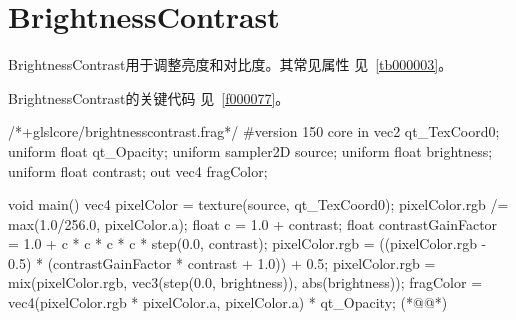﻿

\FloatBarrier
\section{
BrightnessContrast
}\label{c000015s000003}


BrightnessContrast用于调整亮度和对比度。其常见属性
见\tablename\ \ref{tb000003}。



BrightnessContrast的关键代码
见\filesourcenumbernameone\ \ref{f000077}。
\label{f000077}    %
\FloatBarrier                                  %
\begin{thebookfilesourceone}[escapeinside={(*@}{@*)},
caption=GoodLuck,
title=\filesourcenumbernameone \thefilesourcenumber
]
/*+glslcore/brightnesscontrast.frag*/
#version 150 core
in vec2 qt_TexCoord0;
uniform float qt_Opacity;
uniform sampler2D source;
uniform float brightness;
uniform float contrast;
out vec4 fragColor;

void main() {
    vec4 pixelColor = texture(source, qt_TexCoord0);
    pixelColor.rgb /= max(1.0/256.0, pixelColor.a);
    float c = 1.0 + contrast;
    float contrastGainFactor = 1.0 + c * c * c * c * step(0.0, contrast);
    pixelColor.rgb =
        ((pixelColor.rgb - 0.5) * (contrastGainFactor * contrast + 1.0)) + 0.5;
    pixelColor.rgb =
        mix(pixelColor.rgb, vec3(step(0.0, brightness)), abs(brightness));
    fragColor = vec4(pixelColor.rgb * pixelColor.a, pixelColor.a) * qt_Opacity;
}(*@\marginpar[\hfill\setlength\fboxsep{2pt}\fbox{\footnotesize{\kaishu\parbox{1em}{\setlength{\baselineskip}{2pt}\filesourcenumbernameone}}\footnotesize{\thefilesourcenumber}}]{\setlength\fboxsep{2pt}\fbox{\footnotesize{\kaishu\parbox{1em}{\setlength{\baselineskip}{2pt}\filesourcenumbernameone}}\footnotesize{\thefilesourcenumber}}}@*)\end{thebookfilesourceone}          %
\addtocounter{lstlisting}{-1}   %


